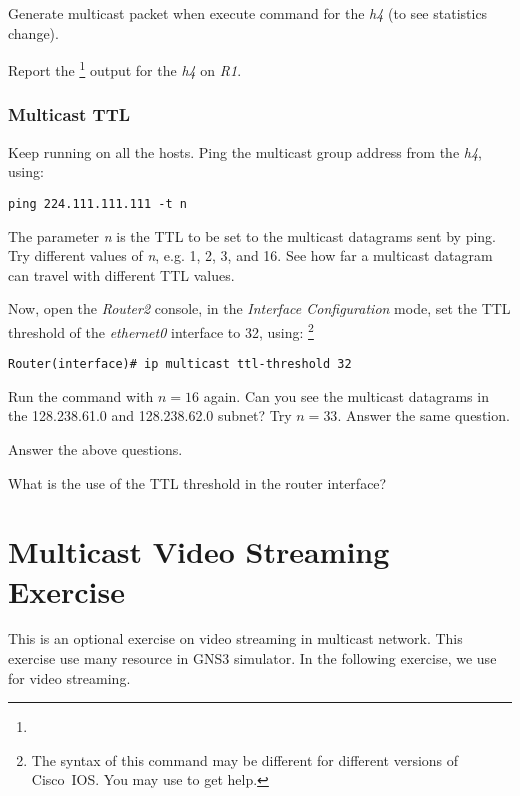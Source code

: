 \documentclass{../UTNetLab}
\begin{document}
Generate multicast packet when execute command for the \textit{h4} (to see statistics change).

\begin{report}
    \item Report the \footnote{} output for the \textit{h4} on \textit{R1}.
\end{report}

\section{Multicast TTL}
Keep  running on all the hosts.
Ping the multicast group address from the \textit{h4}, using:
\begin{lstlisting}[emph={n}]
ping 224.111.111.111 -t n
    \end{lstlisting}

The parameter \textit{n} is the TTL to be set to the multicast datagrams sent by ping.
Try different values of \textit{n}, e.g. 1, 2, 3, and 16.
See how far a multicast datagram can travel with different TTL values.

Now, open the \textit{Router2} console, in the \textit{Interface Configuration} mode, set the TTL threshold of the \textit{ethernet0} interface to 32, using:
\footnote{The syntax of this command may be different for different versions of Cisco~IOS.
    You may use  to get help.}
\begin{lstlisting}[language={cisco}]    
Router(interface)# ip multicast ttl-threshold 32
    \end{lstlisting}

Run the  command with $n = 16$ again.
Can you see the multicast datagrams in the 128.238.61.0 and 128.238.62.0 subnet?
Try $n = 33$.
Answer the same question.

\begin{report}
    \item Answer the above questions.

    \item What is the use of the TTL threshold in the router interface?
\end{report}

\part{Multicast Video Streaming Exercise}
This is an optional exercise on video streaming in multicast network.
This exercise use many resource in GNS3 simulator.
In the following exercise, we use  for video streaming.
\end{document}
